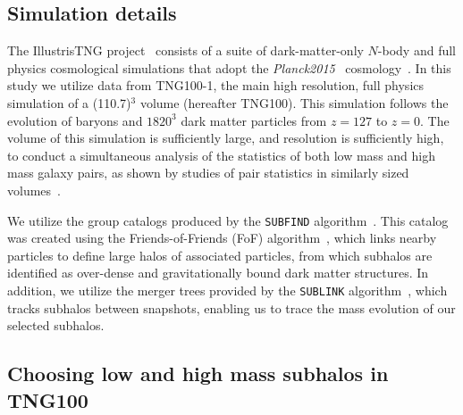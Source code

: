\documentclass[twocolumn]{aastex631}
\begin{document}
    \subsection{Simulation details} \label{sec:methods-sims}
    The IllustrisTNG project~\citep{TNG1, TNG2, TNG3, TNG4, TNG5} consists of a suite of dark-matter-only $N$-body and full physics cosmological simulations that adopt the \textit{Planck2015} \lcdm\  cosmology~\citep{Planck2015}.
    In this study we utilize data from TNG100-1, the main high resolution, full physics simulation of a (110.7\Mpc)$^3$ volume (hereafter TNG100). 
    This simulation follows the evolution of baryons and $1820^3$ dark matter particles from $z=127$ to $z=0$.  
    The volume of this simulation is sufficiently large, and resolution is sufficiently high, to conduct a simultaneous analysis of the statistics of both low mass and high mass galaxy pairs, as shown by studies of pair statistics in similarly sized volumes~\citep{Sales2013,Patel2017a-Orbits,Patel2017b-Masses,Besla2018}. %

    We utilize the group catalogs produced by the \texttt{SUBFIND} algorithm~\citep{Springel2001,Dolag2009}. 
    This catalog was created using the Friends-of-Friends (FoF) algorithm~\citep{Davis1985}, which links nearby particles to define large halos of associated particles, from which subhalos are identified as over-dense and gravitationally bound dark matter structures.
    In addition, we utilize the merger trees provided by the \texttt{SUBLINK} algorithm~\citep{RG2015}, which tracks subhalos between snapshots, enabling us to trace the mass evolution of our selected subhalos. 


    \subsection{Choosing low and high mass subhalos in TNG100} \label{sec:methods-halos}
\end{document}
